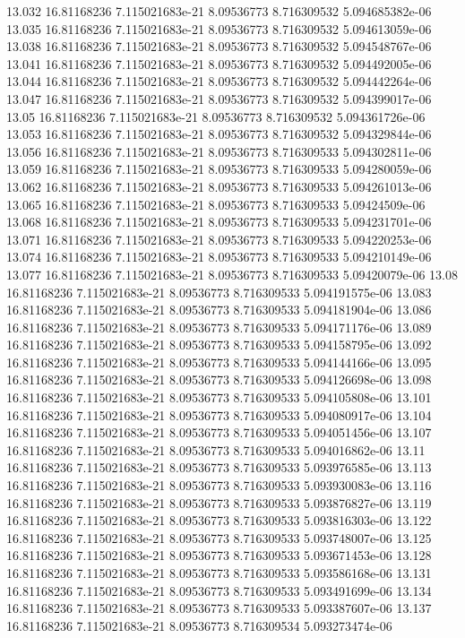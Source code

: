 {13.032 16.81168236 7.115021683e-21 8.09536773 8.716309532 5.094685382e-06
13.035 16.81168236 7.115021683e-21 8.09536773 8.716309532 5.094613059e-06
13.038 16.81168236 7.115021683e-21 8.09536773 8.716309532 5.094548767e-06
13.041 16.81168236 7.115021683e-21 8.09536773 8.716309532 5.094492005e-06
13.044 16.81168236 7.115021683e-21 8.09536773 8.716309532 5.094442264e-06
13.047 16.81168236 7.115021683e-21 8.09536773 8.716309532 5.094399017e-06
13.05 16.81168236 7.115021683e-21 8.09536773 8.716309532 5.094361726e-06
13.053 16.81168236 7.115021683e-21 8.09536773 8.716309532 5.094329844e-06
13.056 16.81168236 7.115021683e-21 8.09536773 8.716309533 5.094302811e-06
13.059 16.81168236 7.115021683e-21 8.09536773 8.716309533 5.094280059e-06
13.062 16.81168236 7.115021683e-21 8.09536773 8.716309533 5.094261013e-06
13.065 16.81168236 7.115021683e-21 8.09536773 8.716309533 5.09424509e-06
13.068 16.81168236 7.115021683e-21 8.09536773 8.716309533 5.094231701e-06
13.071 16.81168236 7.115021683e-21 8.09536773 8.716309533 5.094220253e-06
13.074 16.81168236 7.115021683e-21 8.09536773 8.716309533 5.094210149e-06
13.077 16.81168236 7.115021683e-21 8.09536773 8.716309533 5.09420079e-06
13.08 16.81168236 7.115021683e-21 8.09536773 8.716309533 5.094191575e-06
13.083 16.81168236 7.115021683e-21 8.09536773 8.716309533 5.094181904e-06
13.086 16.81168236 7.115021683e-21 8.09536773 8.716309533 5.094171176e-06
13.089 16.81168236 7.115021683e-21 8.09536773 8.716309533 5.094158795e-06
13.092 16.81168236 7.115021683e-21 8.09536773 8.716309533 5.094144166e-06
13.095 16.81168236 7.115021683e-21 8.09536773 8.716309533 5.094126698e-06
13.098 16.81168236 7.115021683e-21 8.09536773 8.716309533 5.094105808e-06
13.101 16.81168236 7.115021683e-21 8.09536773 8.716309533 5.094080917e-06
13.104 16.81168236 7.115021683e-21 8.09536773 8.716309533 5.094051456e-06
13.107 16.81168236 7.115021683e-21 8.09536773 8.716309533 5.094016862e-06
13.11 16.81168236 7.115021683e-21 8.09536773 8.716309533 5.093976585e-06
13.113 16.81168236 7.115021683e-21 8.09536773 8.716309533 5.093930083e-06
13.116 16.81168236 7.115021683e-21 8.09536773 8.716309533 5.093876827e-06
13.119 16.81168236 7.115021683e-21 8.09536773 8.716309533 5.093816303e-06
13.122 16.81168236 7.115021683e-21 8.09536773 8.716309533 5.093748007e-06
13.125 16.81168236 7.115021683e-21 8.09536773 8.716309533 5.093671453e-06
13.128 16.81168236 7.115021683e-21 8.09536773 8.716309533 5.093586168e-06
13.131 16.81168236 7.115021683e-21 8.09536773 8.716309533 5.093491699e-06
13.134 16.81168236 7.115021683e-21 8.09536773 8.716309533 5.093387607e-06
13.137 16.81168236 7.115021683e-21 8.09536773 8.716309534 5.093273474e-06
}
